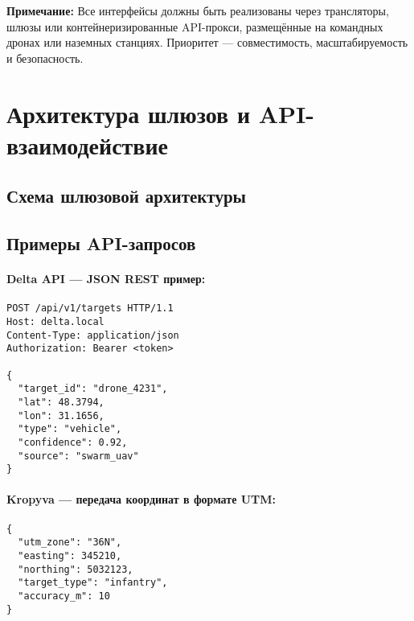 \documentclass[12pt]{article}
\begin{document}
\textbf{Примечание:} Все интерфейсы должны быть реализованы через трансляторы, шлюзы или контейнеризированные API-прокси, размещённые на командных дронах или наземных станциях. Приоритет --- совместимость, масштабируемость и безопасность.

\section{Архитектура шлюзов и API-взаимодействие}
\subsection{Схема шлюзовой архитектуры}
\begin{center}
\end{center}

\subsection{Примеры API-запросов}

\paragraph{Delta API --- JSON REST пример:}
\begin{verbatim}
POST /api/v1/targets HTTP/1.1
Host: delta.local
Content-Type: application/json
Authorization: Bearer <token>

{
  "target_id": "drone_4231",
  "lat": 48.3794,
  "lon": 31.1656,
  "type": "vehicle",
  "confidence": 0.92,
  "source": "swarm_uav"
}
\end{verbatim}

\paragraph{Kropyva --- передача координат в формате UTM:}
\begin{verbatim}
{
  "utm_zone": "36N",
  "easting": 345210,
  "northing": 5032123,
  "target_type": "infantry",
  "accuracy_m": 10
}
\end{verbatim}
\end{document}
